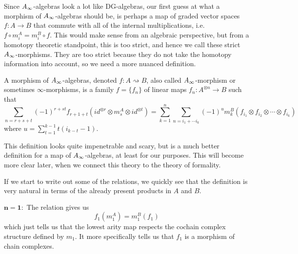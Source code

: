 
Since $\A$-algebras look a lot like DG-algebras, our first guess at what a morphism of $\A$-algebras should be, is perhaps a map of graded vector spaces $f:A\longrightarrow B$ that commute with all of the internal multiplications, i.e. $f\circ m^A_i = m^B_i\circ f$. This would make sense from an algebraic perspective, but from a homotopy theoretic standpoint, this is too strict, and hence we call these strict $\A$-morphisms. They are too strict because they do not take the homotopy information into account, so we need a more nuanced definition. 

\begin{definition}[$\A$-morphism]
\label{def:A_infinity-morphism}
A morphism of $\A$-algebras, denoted $f:A\rightsquigarrow B$, also called $\A$-morphism or sometimes $\infty$-morphisms, is a family $f=\{f_n\}$ of linear maps $f_n:A^{\otimes n}\rightarrow B$ such that 
\begin{equation*}
    \sum_{n = r+s+t}(-1)^{r+st}f_{r+1+t}(id^{\otimes r}\otimes m_s^A \otimes id^{\otimes t}) = \sum_{k=1}^{n}\sum_{n=i_1+\cdots i_k}(-1)^{u} m_k^B(f_{i_1}\otimes f_{i_2}\otimes \cdots \otimes f_{i_k})
\end{equation*}
where $u=\displaystyle \sum_{t=1}^{k-1}t(i_{k-t}-1)$.
\end{definition}

This definition looks quite impenetrable and scary, but is a much better definition for a map of $\A$-algebras, at least for our purposes. This will become more clear later, when we connect this theory to the theory of formality.  

If we start to write out some of the relations, we quickly see that the definition is very natural in terms of the already present products in $A$ and $B$. 

$\mathbf{n=1:}$ The relation gives us
\begin{equation*}
    f_1(m_1^A) = m_1^B(f_1)
\end{equation*}
which just tells us that the lowest arity map respects the cochain complex structure defined by $m_1$. It more specifically tells us that $f_1$ is a morphism of chain complexes. 

